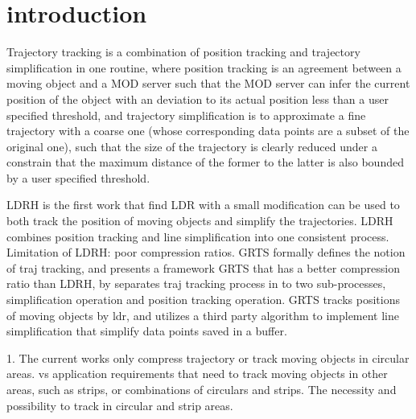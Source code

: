 

\section{introduction}
\label{sec-intro}


Trajectory tracking \cite{Lange:Tracking} is a combination of position tracking \cite{Wolfson:PositionTracking} and trajectory simplification in one routine, where position tracking is an agreement between a moving object and a MOD server such that the MOD server can infer the current position of the object with an deviation to its actual position less than a user specified threshold,
and trajectory simplification is to approximate a fine trajectory with a coarse one (whose corresponding data points are a subset of the original one), such that the size of the trajectory is clearly reduced under a constrain that the maximum distance of the former to the latter is also bounded by a user specified threshold.

LDRH is the first work that find LDR with a small modification can be used to both track the position of moving objects and simplify the trajectories. LDRH combines position tracking and line simplification into one consistent process. Limitation of LDRH: poor compression ratios. 
GRTS formally defines the notion of traj tracking, and presents a framework GRTS that has a better compression ratio than LDRH, by separates traj tracking process in to two sub-processes, simplification operation and position tracking operation. GRTS tracks positions of moving objects by ldr, and utilizes a third party algorithm to implement line simplification that simplify data points saved in a buffer.


1. The current works only compress trajectory or track moving objects in circular areas. vs application requirements that need to track moving objects in other areas, such as strips, or combinations of circulars and strips.
The necessity and possibility to track in circular and strip areas.

